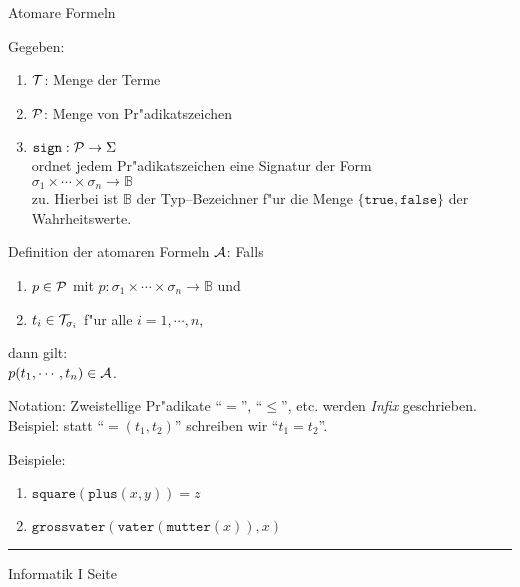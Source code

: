 \begin{slide}{}
\normalsize
\begin{center}
Atomare Formeln
\end{center}
\vspace{0.5cm}

\footnotesize
Gegeben:
\begin{enumerate}
\item ${\cal T}$: \quad Menge der Terme
\item ${\cal P}$: \quad Menge von Pr"adikatszeichen
\item $\mathtt{sign}: {\cal P} \rightarrow \Sigma$ \\[0.3cm]
      ordnet jedem Pr"adikatszeichen eine Signatur der Form \\[0.1cm]
      \hspace*{1.3cm} $\sigma_1 \times \cdots \times \sigma_n \rightarrow \mathbb{B}$ \\[0.3cm]
      zu.  Hierbei ist $\mathbb{B}$ der Typ--Bezeichner f"ur die Menge $\{ \mathtt{true}, \mathtt{false} \}$
      der Wahrheitswerte.
      
\end{enumerate}
Definition der atomaren Formeln ${\cal A}$:  Falls
\begin{enumerate}
\item $p\in {\cal P}$ mit $p: \sigma_1 \times \cdots \times \sigma_n \rightarrow \mathbb{B}$ und
\item $t_i \in {\cal T}_{\sigma_i}$ f"ur alle $i=1, \cdots, n$,
\end{enumerate}
dann gilt: \\[0.1cm]
\hspace*{1.3cm} $p(t_1, \cdots, t_n) \in{\cal A}$.

Notation: Zweistellige Pr"adikate ``$=$'', ``$\leq$'', etc. werden {\em Infix} geschrieben.  
Beispiel: statt ``$=(t_1, t_2)$'' schreiben wir ``$t_1 = t_2$''.

Beispiele:
\begin{enumerate}
\item $\mathtt{square}(\mathtt{plus}(x,y)) = z$
\item $\mathtt{grossvater}(\mathtt{vater}(\mathtt{mutter}(x)), x)$
\end{enumerate}


\vspace*{\fill}
\tiny \addtocounter{mypage}{1}
\rule{15cm}{1mm}
Informatik I  \hspace*{\fill} Seite 
\end{slide}

